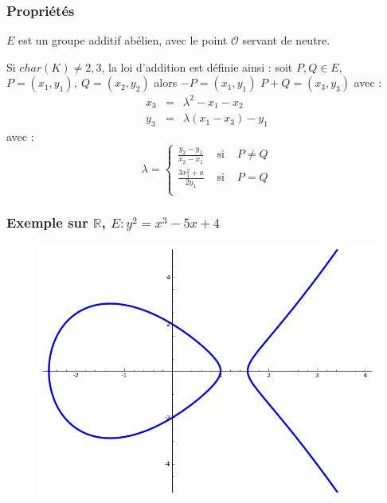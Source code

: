 \documentclass[9pt]{beamer}
\begin{document}
\begin{frame}
    \frametitle{Propriétés}
    \begin{thrm}
        $E$ est un groupe additif abélien, avec le point $\mathcal{O}$ servant de neutre.
    \end{thrm}

    \begin{df}
        Si $char(K) \neq 2,3$, la loi d'addition est définie ainsi : soit $P,Q \in E$, $P = (x_1,
        y_1),\ Q = (x_2, y_2)$ alors $-P = (x_1, y_1)$ $P + Q = (x_3, y_3)$ avec : \[
            \begin{array}{rcl}
                x_3 & = & \lambda^2 - x_1 - x_2 \\
                y_3 & = & \lambda(x_1 - x_3) - y_1
            \end{array}
        \]
        avec : \[
            \lambda = \left \lbrace \begin{array}{rcl}
                \displaystyle \frac{y_2 - y_1}{x_2 - x_1} & \mbox{ si } & P \neq Q \\
                \displaystyle \frac{3x_1^2 + a}{2y_1} & \mbox{ si } & P = Q \\
                \end{array} \right.
            \]
    \end{df}
\end{frame}

\begin{frame}
    \frametitle{Exemple sur $\mathbb{R}$, $E : y^2 = x^3 - 5x + 4$}
    \begin{figure}
        \includegraphics[scale=0.5]{ecc41.png}
    \end{figure}
\end{frame}
\end{document}
